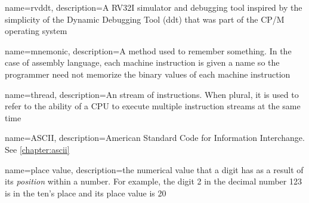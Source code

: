{
	name={rvddt},
	description={A RV32I simulator and debugging tool inspired by the
		simplicity of the Dynamic Debugging Tool (ddt) that was part of
		the CP/M operating system}
}

{
	name={mnemonic},
	description={A method used to remember something.  In the case of
		assembly language, each machine instruction is given a name
		so the programmer need not memorize the binary values of each
		machine instruction}
}

{
	name={thread},
	description={An stream of instructions.  When plural, it is
		used to refer to the ability of a CPU to execute multiple
		instruction streams at the same time}
}

{
	name={ASCII},
	description={American Standard Code for Information Interchange.
		See \autoref{chapter:ascii}}
}

{
	name={place value},
	description={the numerical value that a digit has as a result of its {\em position} within a number.
	For example, the digit 2 in the decimal number 123 is in the ten's place and its place value is 20}
}

